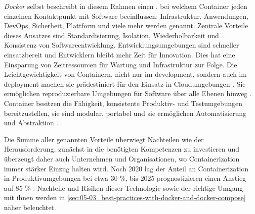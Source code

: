\textit{Docker} selbst beschreibt in diesem Rahmen einen , bei welchem Container jeden einzelnen Kontaktpunkt mit Software beeinflussen: Infrastruktur, Anwendungen, \hyperref[sec:03-01_introduction-to-devops]{DevOps}, Sicherheit, Plattform und viele mehr werden genannt. Zentrale Vorteile dieses Ansatzes sind Standardisierung, Isolation, Wiederholbarkeit und Konsistenz von Softwareentwicklung. Entwicklungsumgebungen sind schneller einsatzbereit und Entwicklern bleibt mehr Zeit für Innovation. Dies hat eine Einsparung von Zeitressourcen für Wartung und Infrastruktur zur Folge. \cite{016:Effectively-managing-all-of-those-Applications} Die Leichtgewichtigkeit von Containern, nicht nur im \Gls{development}, sondern auch im \Gls{deployment} machen sie prädestiniert für den Einsatz in Cloudumgebungen \cite{015:Containers-in-Software-Development,024:Investiugating-Impact-of-Containerization-on-Deployment-Process-in-DevOps,025:Exploring-Solutions-for-Container-Image-Security}. Sie ermöglichen reproduzierbare Umgebungen für Software über alle Ebenen hinweg \cite{013:Role-of-Containers-in-Reproducibility,024:Investiugating-Impact-of-Containerization-on-Deployment-Process-in-DevOps}. Container besitzen die Fähigkeit, konsistente Produktiv- und Testumgebungen bereitzustellen, sie sind modular, portabel und sie ermöglichen Automatisierung und Abstraktion \cite{014:Managing-Container-based-Software-Development-Environments}.

Die Summe aller genannten Vorteile überwiegt Nachteilen wie der Herausforderung, zunächst in die benötigten Kompetenzen zu investieren und überzeugt daher auch Unternehmen und Organisationen, wo Containerization immer stärker Einzug halten wird. Noch 2020 lag der Anteil an Containerization in Produktivumgebungen bei etwa 30 \%, bis 2025 prognostizieren \citeauthor{020:Assessing-and-Improving-Quality-of-Docker-Artifacts} einen Anstieg auf 85 \% \cite{020:Assessing-and-Improving-Quality-of-Docker-Artifacts}. Nachteile und Risiken dieser Technologie sowie der richtige Umgang mit ihnen werden in \autoref{sec:05-03_best-practices-with-docker-and-docker-compose} näher beleuchtet.
